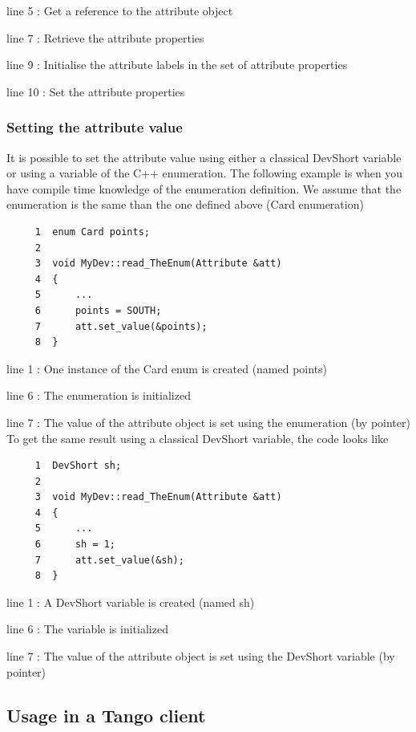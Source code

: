 line 5 : Get a reference to the attribute object

line 7 : Retrieve the attribute properties

line 9 : Initialise the attribute labels in the set of attribute properties

line 10 : Set the attribute properties


\subsubsection{Setting the attribute value}

It is possible to set the attribute value using either a classical
DevShort variable or using a variable of the C++ enumeration. The
following example is when you have compile time knowledge of the enumeration
definition. We assume that the enumeration is the same than the one
defined above (Card enumeration)


\begin{verbatim}
     1  enum Card points;
     2  
     3  void MyDev::read_TheEnum(Attribute &att)
     4  {
     5      ...
     6      points = SOUTH;
     7      att.set_value(&points);
     8  }
\end{verbatim}


line 1 : One instance of the Card enum is created (named points)

line 6 : The enumeration is initialized

line 7 : The value of the attribute object is set using the enumeration
(by pointer)\\
To get the same result using a classical DevShort variable, the code
looks like


\begin{verbatim}
     1  DevShort sh;
     2  
     3  void MyDev::read_TheEnum(Attribute &att)
     4  {
     5      ...
     6      sh = 1;
     7      att.set_value(&sh);
     8  }
\end{verbatim}


line 1 : A DevShort variable is created (named sh)

line 6 : The variable is initialized

line 7 : The value of the attribute object is set using the DevShort
variable (by pointer)


\subsection{Usage in a Tango client}

